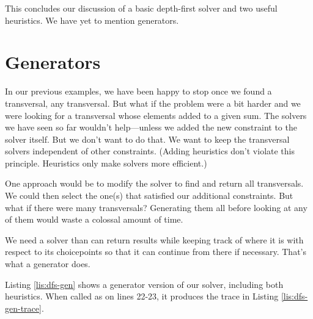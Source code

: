 This concludes our discussion of a basic depth-first solver and two useful heuristics. We have yet to mention generators.

\section{Generators} \label{sec:generators}
In our previous examples, we have been happy to stop once we found a transversal,  any transversal. But what if the problem were a bit harder and we were looking for a transversal whose elements added to a given sum. The solvers we have seen so far wouldn't help---unless we added the new constraint to the solver itself. But we don't want to do that. We want to keep the transversal solvers independent of other constraints. (Adding heuristics don't violate this principle. Heuristics only make solvers more efficient.)

One approach would be to modify the solver to find and return all transversals. We could then select the one(s) that satisfied our additional constraints. But what if there were many transversals? Generating them all before looking at any of them would waste a colossal amount of time. 

We need a solver than can return results while keeping track of where it is with respect to its choicepoints so that it can continue from there if necessary. That's what a generator does. 

Listing \ref{lis:dfs-gen} shows a generator version of our solver, including both heuristics. When called as on lines 22-23, it produces the trace in Listing \ref{lis:dfs-gen-trace}. 

